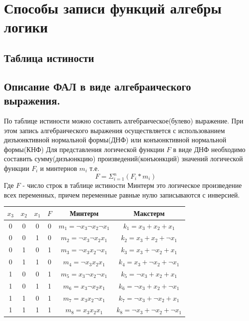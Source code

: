\documentclass[a4paper]{article}
\begin{document}
\section{Способы записи функций алгебры логики}
\subsection{Таблица истиности}
\subsection{Описание ФАЛ в виде алгебраического выражения.}
По таблице истиности можно составить алгебраическое(булево) выражение. При этом запись алгебраического выражения осуществляется с использованием дизъюнктивной нормальной формы(ДНФ)
или конъюнктивной нормальной формы(КНФ)
Для представления логической функции $F$ в виде ДНФ необходимо составить сумму(дизъюнкцию)
произведений(конъюнкций) значений логической функции $F_i$ и минтернов $m_i$ т.е.
$$ F = \Sigma_{i = 1}^n (F_i * m_i) $$ Где $F$ - число строк в таблице истиности
Минтерм это логическое произведение всех переменных, причем переменные равные нулю записываются с инверсией.

\begin{table}[ht]
\centering
\begin{tabular}{|c|c|c|c|c|c|}
\hline
$x_3$ & $x_2$ & $x_1$ & $F$ & Минтерм & Макстерм \\
\hline
0 & 0 & 0 & 0 & $ m_1 = \neg x_3\neg x_2\neg x_1 $ & $ k_1 = x_3 + x_2 + x_1    $ \\
0 & 0 & 1 & 0 & $ m_2 = \neg x_3\neg x_2x_1  $ & $ k_2 = x_3 + x_2 + \neg x_1   $ \\
0 & 1 & 0 & 1 & $ m_3 = \neg x_3x_2\neg x_1  $ & $ k_3 = x_3 + \neg x_2 + x_1   $ \\
0 & 1 & 1 & 0 & $ m_4 = \neg x_3x_2x_1   $ & $ k_4 = x_3 + \neg x_2 + \neg x_1  $ \\
1 & 0 & 0 & 1 & $ m_5 = x_3\neg x_2\neg x_1  $ & $ k_5 = \neg x_3 + x_2 + x_1   $ \\
1 & 0 & 1 & 1 & $ m_6 = x_3\neg x_2x_1   $ & $ k_6 = \neg x_3 + x_2 + \neg x_1  $ \\
1 & 1 & 0 & 1 & $ m_7 = x_3x_2\neg x_1   $ & $ k_7 = \neg x_3 + \neg x_2 + x_1  $ \\
1 & 1 & 1 & 1 & $ m_8 = x_3x_2x_1    $ & $ k_8 = \neg x_3 + \neg x_2 + \neg x_1 $ \\
\hline
\end{tabular}
\end{table}
\end{document}
